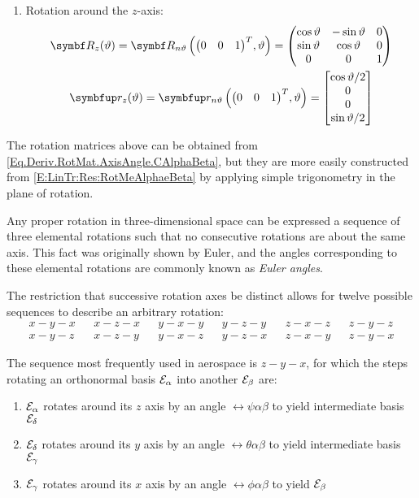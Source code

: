 \begin{enumerate}
\item Rotation around the $z$-axis:
\begin{subequations}
\begin{gather}
	\mat{\rotm_{z}}(\rotang) = \RotMAxAng{\tr{\matenv{0 & 0 & 1}}}{\rotang} = 
	\begin{pmatrix}
		\cos \rotang	&-\sin \rotang	&0	\\
		\sin \rotang	&\cos \rotang	&0\\
		0		&0			&1
	\end{pmatrix} \label{Eq:AttRep:ElemRot:Z:RotM}
	\\
	\quat{\rotq}_{z}(\rotang) = \RotQAxAng{\tr{\matenv{0 & 0 & 1}}}{\rotang} = 
	\qcolcmp{\cos \rotang / 2}{0}{0}{\sin \rotang /2} \label{Eq:AttRep:ElemRot:Z:RotQ}
\end{gather}
\end{subequations}

\end{enumerate}

The rotation matrices above can be obtained from \eqref{Eq.Deriv.RotMat.AxisAngle.CAlphaBeta}, but they are more easily constructed from \eqref{E:LinTr:Res:RotMeAlphaeBeta} by applying simple trigonometry in the plane of rotation.

Any proper rotation in three-dimensional space can be expressed a sequence of three elemental rotations such that no consecutive rotations are about the same axis. This fact was originally shown by Euler, and the angles corresponding to these elemental rotations are commonly known as \emph{Euler angles}.

The restriction that successive rotation axes be distinct allows for twelve possible sequences to describe an arbitrary rotation:
\begin{align*}
	x-y-x &&x-z-x &&y-x-y &&y-z-y &&z-x-z &&z-y-z\\ 
	x-y-z &&x-z-y &&y-x-z &&y-z-x &&z-x-y &&z-y-x 
\end{align*}

The sequence most frequently used in aerospace is $z-y-x$, for which the steps rotating an orthonormal basis $\basis[\alpha]$ into another $\basis[\beta]$ are:
\begin{enumerate}[1)]

	\item $\basis[\alpha]$ rotates around its $z$ axis by an angle $\rel{\psi}{\alpha}{\beta}$ to yield intermediate basis $\basis[\delta]$
	\item $\basis[\delta]$ rotates around its $y$ axis by an angle $\rel{\theta}{\alpha}{\beta}$ to yield intermediate basis $\basis[\gamma]$
	\item $\basis[\gamma]$ rotates around its $x$ axis by an angle $\rel{\phi}{\alpha}{\beta}$ to yield $\basis[\beta]$
	
\end{enumerate}

